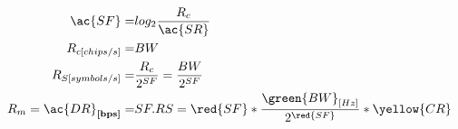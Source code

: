 


\begin{align}
\ac{SF}                     =& log_{2} \frac{R_{c}}{\ac{SR}}											\\
R_{c[chips/s]} 		  		=& BW 																		\\
R_{S[symbols/s]} 			=& \frac{R_{c}}{2^{SF}} = \frac{BW}{2^{SF}}								\\
R_{m}=\ac{DR}_{\textbf{[bps]}}    =& SF.RS=\red{SF}*\frac{\green{BW}_{[Hz]}}{2^{\red{SF}}}*\yellow{CR}		\\
\end{align}


